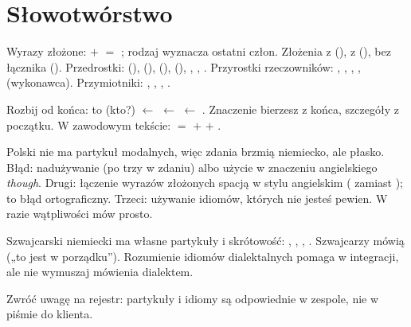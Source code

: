 \section{Słowotwórstwo}
Wyrazy złożone:  $+$  $=$ ; rodzaj wyznacza ostatni człon. Złożenia z  (), z 
(), bez łącznika (). Przedrostki:  (),  (),  (),
 (), , , . Przyrostki rzeczowników: , , , ,  (wykonawca). Przymiotniki: , , , .

\begin{zasada}
Rozbij od końca:  to  (kto?) $\leftarrow$  $\leftarrow$  $\leftarrow$ .
Znaczenie bierzesz z końca, szczegóły z początku. W zawodowym tekście:  $=$  $+$  $+$ .
\end{zasada}

\begin{falle}
Polski nie ma partykuł modalnych, więc zdania brzmią niemiecko, ale płasko. Błąd: nadużywanie (po trzy w zdaniu) albo użycie 
w znaczeniu angielskiego \emph{though}. Drugi: łączenie wyrazów złożonych spacją w stylu angielskim ( zamiast ); to błąd
ortograficzny. Trzeci: używanie idiomów, których nie jesteś pewien. W razie wątpliwości mów prosto.
\end{falle}

\begin{szwajcaria}
Szwajcarski niemiecki ma własne partykuły i skrótowość: , , , . Szwajcarzy mówią 
(„to jest w porządku”). Rozumienie idiomów dialektalnych pomaga w integracji, ale nie wymuszaj mówienia dialektem.
\end{szwajcaria}

\begin{praca}
    Zwróć uwagę na rejestr: partykuły i idiomy są odpowiednie w zespole, nie w piśmie do klienta.
\end{praca}


